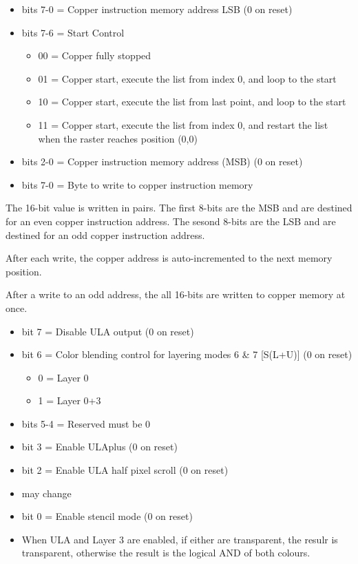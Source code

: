 \begin{itemize}
\item bits 7-0 = Copper instruction memory address LSB (0 on reset)
\end{itemize}

\begin{itemize}
\item bits 7-6 = Start Control
  \begin{itemize}
  \item[] 00 = Copper fully stopped
  \item[] 01 = Copper start, execute the list from index 0, and loop
    to the start
  \item[] 10 = Copper start, execute the list from last point, and
    loop to the start
  \item[] 11 = Copper start, execute the list from index 0, and
    restart the list when the raster reaches position (0,0)
  \end{itemize}
\item bits 2-0 = Copper instruction memory address (MSB) (0 on reset)
\end{itemize}

\begin{itemize}
\item bits 7-0 = Byte to write to copper instruction memory
\end{itemize}
The 16-bit value is written in pairs. The first 8-bits are the MSB and
are destined for an even copper instruction address. The sesond 8-bits
are the LSB and are destined for an odd copper instruction address.

After each write, the copper address is auto-incremented to the next
memory position.

After a write to an odd address, the all 16-bits are written to copper
memory at once.

\begin{itemize}
\item bit 7 = Disable ULA output (0 on reset)
\item bit 6 = Color blending control for layering modes 6 \& 7
  [S(L+U)] (0 on reset)
  \begin{itemize}
  \item 0 = Layer 0
  \item 1 = Layer 0+3
  \end{itemize}
\item bits 5-4 = Reserved must be 0
\item bit 3 = Enable ULAplus (0 on reset)
\item bit 2 = Enable ULA half pixel scroll (0 on reset)
\item[] may change
\item bit 0 = Enable stencil mode (0 on reset)
\item[] When ULA and Layer 3 are enabled, if either are transparent,
  the resulr is transparent, otherwise the result is the logical AND
  of both colours.
\end{itemize}

